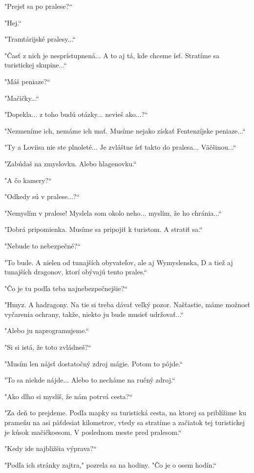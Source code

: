 \documentclass{book}
\begin{document}
"$ $Prejsť sa po pralese?“

"$ $Hej.“

"$ $Tramtárijské pralesy...“

"$ $Časť z nich je nesprístupnená... A to aj tá, kde chceme ísť. Stratíme sa turistickej skupine...“

"$ $Máš peniaze?“

"$ $Mačičky...“

"$ $Dopekla... z toho budú otázky... nevieš ako...?“

"$ $Nezmeníme ich, nemáme ich mať. Musíme nejako získať Fentenzíjske peniaze...“

"$ $Ty a Loviisa nie ste plnoleté... Je zvláštne ísť takto do pralesa... Väčšinou...“

"$ $Zabúdaš na zmyslovku. Alebo hlagenovku.“

"$ $A čo kamery?“

"$ $Odkedy sú v pralese...?“

"$ $Nemyslím v pralese! Myslela som okolo neho... myslím, že ho chránia...“

"$ $Dobrá pripomienka. Musíme sa pripojiť k turistom. A stratiť sa.“

"$ $Nebude to nebezpečné?“

"$ $To bude. A nielen od tunajších obyvateľov, ale aj Wymyslenska, D a tiež aj tunajších dragonov, ktorí obývajú tento prales.“

"$ $Čo je tu podľa teba najnebezpečnejšie?“

"$ $Hmyz. A hadragony. Na tie si treba dávať veľký pozor. Našťastie, máme možnosť vyčarenia ochrany, takže, niekto ju bude musieť udržovať...“

"$ $Alebo ju naprogramujeme.“

"$ $Si si istá, že toto zvládneš?“

"$ $Musím len nájsť dostatočný zdroj mágie. Potom to pôjde.“

"$ $To sa niekde nájde... Alebo to necháme na ručný zdroj.“

"$ $Ako dlho si myslíš, že nám potrvá cesta?“

"$ $Za deň to prejdeme. Podľa mapky sa turistická cesta, na ktorej sa priblížime ku prameňu na asi päťdesiat kilometrov, vtedy sa stratíme a začiatok tej turistickej je kúsok mačičkoesom. V poslednom meste pred pralesom.“

"$ $Kedy ide najbližšia výprava?“

"$ $Podľa ich stránky zajtra,"$ $ pozrela sa na hodiny. "$ $Čo je o osem hodín.“
\end{document}
